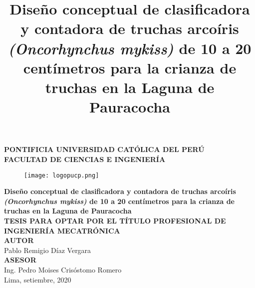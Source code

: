 \clearpage{\pagestyle{empty}\cleardoublepage}
\begin{titlepage}
\begin{center}
 {\Large \bf PONTIFICIA UNIVERSIDAD CATÓLICA DEL PERÚ}\\
  \vspace{0.8 cm} 
  {\Large \bf FACULTAD DE CIENCIAS E INGENIERÍA}\\
  \vspace{1.75 cm}
 \begin{figure}[H]
    \centering
    \texttt{[image: logopucp.png]}
\end{figure}
  \vspace{0.25cm}

\title{Diseño conceptual de clasificadora y contadora de truchas arcoíris \textit{(Oncorhynchus mykiss)} de 10 a 20 centímetros para la crianza de truchas en la Laguna de Pauracocha} %
{\Large \bf Diseño conceptual de clasificadora y contadora de truchas arcoíris \textit{(Oncorhynchus mykiss)} de 10 a 20 centímetros para la crianza de truchas en la Laguna de Pauracocha}\\ %
\vspace{0.5cm}
{\Large \bf TESIS PARA OPTAR POR EL TÍTULO PROFESIONAL DE INGENIERÍA MECATRÓNICA}\\[2.0 cm]
{\large \bf AUTOR}\\[0.5cm]
{\large Pablo Remigio Díaz Vergara}\\[1.75 cm] %
{\large \bf ASESOR}\\[0.5 cm] 
{\large Ing. Pedro Moises Crisóstomo Romero}\\[0.5 cm] %
\vspace{2.0 cm}
{\large Lima, setiembre, 2020}

\end{center}
\end{titlepage}